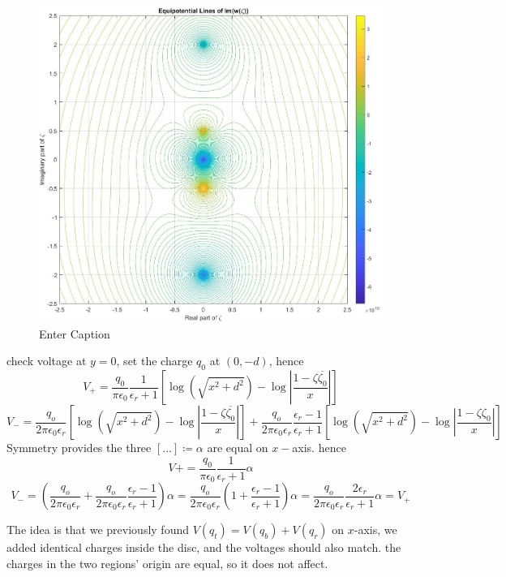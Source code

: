 \begin{figure}[H]
    \centering
    \includegraphics[width=1.\linewidth]{Figs/disc phase, inside dieletric.jpg}
    \caption{Enter Caption}
    \label{fig:enter-label}
\end{figure}

check voltage at $y=0$, set the charge $q_0$ at $(0, -d)$, hence
\[
V_+= \frac{q_0}{\pi \epsilon_0}\frac{1}{\epsilon_r+1} \left[ \log\left(\sqrt{x^2+d^2}\right) -\log\left|\frac{1-\zeta\overline{\zeta_0}}{x}\right| \right]
\]
\[
V_-= \frac{q_o}{2\pi \epsilon_0\epsilon_r} \left[ \log\left(\sqrt{x^2+d^2}\right) -\log\left|\frac{1-\zeta\overline{\zeta_0}}{x}\right| \right]
+\frac{q_o}{2\pi \epsilon_0\epsilon_r}\frac{\epsilon_r-1}{\epsilon_r+1} \left[ \log(\sqrt{x^2+d^2}) - \log\left|\frac{1-\zeta\zeta_0}{x}\right| \right]
\]
Symmetry provides the three $[...]\coloneqq \alpha$ are equal on $x-$axis. hence 
\[
V+=\frac{q_0}{\pi \epsilon_0}\frac{1}{\epsilon_r+1} \alpha\]
\[
V_-=\left(\frac{q_o}{2\pi \epsilon_0\epsilon_r} +\frac{q_o}{2\pi \epsilon_0\epsilon_r}\frac{\epsilon_r-1}{\epsilon_r+1}\right)\alpha
=\frac{q_o}{2\pi \epsilon_0\epsilon_r}\left( 1+\frac{\epsilon_r-1}{\epsilon_r+1}\right)\alpha
=\frac{q_o}{2\pi \epsilon_0\epsilon_r}\frac{2\epsilon_r}{\epsilon_r+1}\alpha=V_+
\]


The idea is that we previously found $V(q_t)=V(q_b)+V(q_r)$ on $x$-axis, we added identical charges inside the disc, and the voltages should also match. the charges in the two regions' origin are equal, so it does not affect. 

